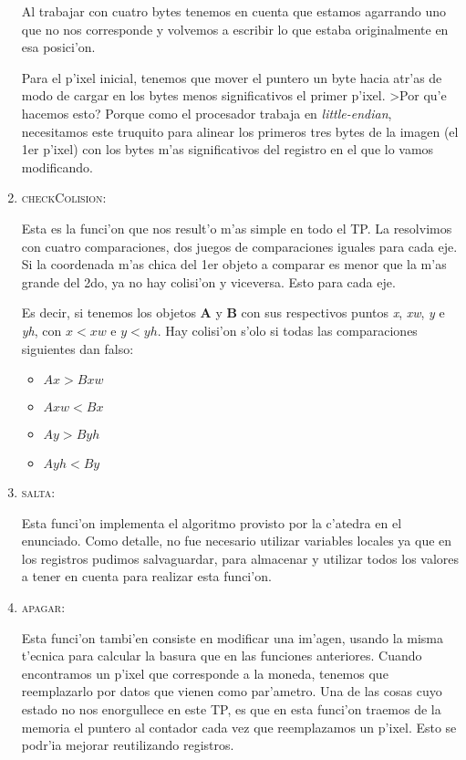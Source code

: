 \begin{enumerate}
Al trabajar con cuatro bytes tenemos en cuenta que estamos agarrando uno que no
nos corresponde y volvemos a escribir lo que estaba originalmente en esa
posici'on.  

Para el p'ixel inicial, tenemos que mover el puntero un byte hacia atr'as de
modo de cargar en los bytes menos significativos el primer p'ixel.  >Por qu'e
hacemos esto?  Porque como el procesador trabaja en \textit{little-endian}, necesitamos
este truquito para alinear los primeros tres bytes de la imagen (el 1er p'ixel)
con los bytes m'as significativos del registro en el que lo vamos modificando.

\item \textsc{checkColision}:

Esta es la funci'on que nos result'o m'as simple en todo el TP.  La resolvimos
con cuatro comparaciones, dos juegos de comparaciones iguales para cada eje.
Si la coordenada m'as chica del 1er objeto a comparar es menor que la m'as
grande del 2do, ya no hay colisi'on y viceversa.  Esto para cada eje.

Es decir, si tenemos los objetos \textbf{A} y \textbf{B} con sus respectivos
puntos \textit{x}, \textit{xw}, \textit{y} e \textit{yh}, con $x < xw$ e $y < yh$. Hay colisi'on s'olo si
todas las comparaciones siguientes dan falso:
\begin{itemize}
  \item $Ax > Bxw$
  \item $Axw < Bx$
  \item $Ay > Byh$
  \item $Ayh < By$
\end{itemize}

\item \textsc{salta}:

Esta funci'on implementa el algoritmo provisto por la c'atedra en el enunciado.
Como detalle, no fue necesario utilizar variables locales ya que en los
registros pudimos salvaguardar, para almacenar y utilizar todos los valores a
tener en cuenta para realizar esta funci'on.

\pagebreak
\item \textsc{apagar}:

Esta funci'on tambi'en consiste en modificar una im'agen, usando la misma
t'ecnica para calcular la basura que en las funciones anteriores.  Cuando
encontramos un p'ixel que corresponde a la moneda, tenemos que reemplazarlo por
datos que vienen como par'ametro.  Una de las cosas cuyo estado no nos
enorgullece en este TP, es que en esta funci'on traemos de la memoria el
puntero al contador cada vez que reemplazamos un p'ixel.  Esto se podr'ia
mejorar reutilizando registros.
\end{enumerate}



